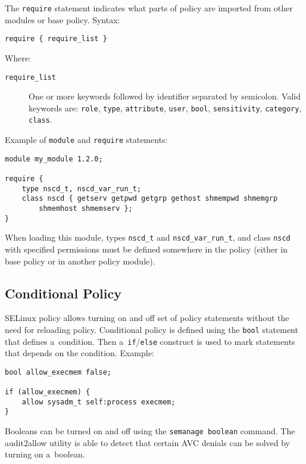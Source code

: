 The \texttt{require} statement indicates what parts of policy are imported from
other modules or base policy. Syntax:
\begin{lstlisting}[language=te]
require { require_list }
\end{lstlisting}
Where:
\begin{description}
    \item [\texttt{require\_list}] One or more keywords followed by identifier
        separated by semicolon. Valid keywords are: \texttt{role},
        \texttt{type}, \texttt{attribute}, \texttt{user}, \texttt{bool},
        \texttt{sensitivity}, \texttt{category}, \texttt{class}.
\end{description}

Example of \texttt{module} and \texttt{require} statements:
\begin{lstlisting}[language=te]
module my_module 1.2.0;

require {
    type nscd_t, nscd_var_run_t;
    class nscd { getserv getpwd getgrp gethost shmempwd shmemgrp
        shmemhost shmemserv };
}
\end{lstlisting}
When loading this module, types \texttt{nscd\_t} and \texttt{nscd\_var\_run\_t},
and class \texttt{nscd} with specified permissions must be defined somewhere in
the policy (either in base policy or in another policy module).

\subsection{Conditional Policy}
\label{booleans}
SELinux policy allows turning on and off set of policy statements without the
need for reloading policy. Conditional policy is defined using the \texttt{bool}
statement that defines a~condition. Then a~\texttt{if}/\texttt{else} construct
is used to mark statements that depends on the condition. Example:
\begin{lstlisting}[language=te]
bool allow_execmem false;

if (allow_execmem) {
    allow sysadm_t self:process execmem;
}
\end{lstlisting}
Booleans can be turned on and off using the \texttt{semanage boolean} command.
The audit2allow utility is able to detect that certain AVC denials can be solved
by turning on a~boolean.

